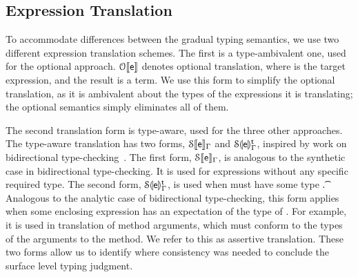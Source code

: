 \documentclass[USenglish]{tex/lipics-v2016}
\begin{document}
\subsection{Expression Translation} 

To accommodate differences between the gradual typing semantics, we use two
different expression translation schemes. The first is a type-ambivalent
one, used for the optional approach. $\TR[\OTS]\e$ denotes optional translation,
where \e is the target expression, and the result is a \kafka term. We use
this form to simplify the optional translation, as it is ambivalent about the
types of the expressions it is translating; the optional semantics simply
eliminates all of them.

The second translation form is type-aware, used for the three other
approaches. The type-aware translation has two forms, $\TRG[\SOMS]\e\Env$
and $\TAG[\SOMS]\e\Env\t$, inspired by work on bidirectional
type-checking~\cite{pierce:1998:local}.  The first form,
$\TRG[\SOMS]\e\Env$, is analogous to the synthetic case in bidirectional
type-checking.  It is used for expressions without any specific required
type.  The second form, $\TAG[\SOMS]\e\Env\t$, is used when \e must have
some type \t. Analogous to the analytic case of bidirectional type-checking,
this form applies when some enclosing expression has an expectation of the
type of \e. For example, it is used in translation of method arguments,
which must conform to the types of the arguments to the method. We refer to
this as assertive translation. These two forms allow us to identify where
consistency was needed to conclude the surface level typing judgment.
\end{document}
